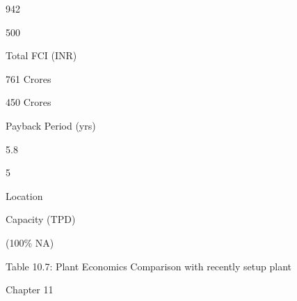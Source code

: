 \documentclass[a4paper,portrait,12pt]{article}
\begin{document}
942





500





\begin{flushleft}
Total FCI (INR)
\end{flushleft}





\begin{flushleft}
761 Crores
\end{flushleft}





\begin{flushleft}
450 Crores
\end{flushleft}





\begin{flushleft}
Payback Period (yrs)
\end{flushleft}





5.8





5





\begin{flushleft}
Location
\end{flushleft}


\begin{flushleft}
Capacity (TPD)
\end{flushleft}


\begin{flushleft}
(100\% NA)
\end{flushleft}





\begin{flushleft}
Table 10.7: Plant Economics Comparison with recently setup plant
\end{flushleft}





\begin{flushleft}
\newpage
Chapter 11
\end{flushleft}
\end{document}
